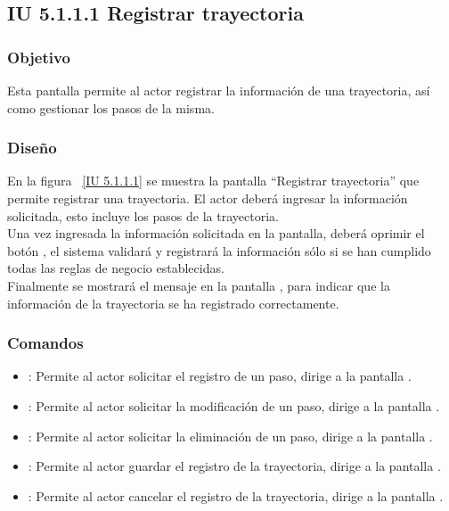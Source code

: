 \newpage 
\subsection{IU 5.1.1.1 Registrar trayectoria}

\subsubsection{Objetivo}
	
	Esta pantalla permite al actor registrar la información de una trayectoria, así como gestionar los pasos de la misma.

\subsubsection{Diseño}

    En la figura ~\ref{IU 5.1.1.1} se muestra la pantalla ``Registrar trayectoria'' que permite registrar una trayectoria. El actor deberá ingresar la información solicitada, 
    esto incluye los pasos de la trayectoria.\\
    
    
    Una vez ingresada la información solicitada en la pantalla, deberá oprimir el botón 
    , el sistema validará y registrará la información sólo si se han cumplido todas las reglas de negocio establecidas.  \\
    
    Finalmente se mostrará el mensaje  en la pantalla ,
    para indicar que la información de la trayectoria
    se ha registrado correctamente.        




\subsubsection{Comandos}
\begin{itemize}
	\item {}: Permite al actor solicitar el registro de un paso, dirige a la pantalla .
	\item \btnEditar[Modificar]: Permite al actor solicitar la modificación de un paso, dirige a la pantalla .
	\item \btnEliminar[Eliminar]: Permite al actor solicitar la eliminación de un paso, dirige a la pantalla .
	\item {}: Permite al actor guardar el registro de la trayectoria, dirige a la pantalla .
	\item {}: Permite al actor cancelar el registro de la trayectoria, dirige a la pantalla .
\end{itemize}

